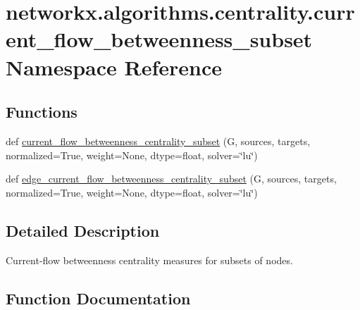 \hypertarget{namespacenetworkx_1_1algorithms_1_1centrality_1_1current__flow__betweenness__subset}{}\section{networkx.\+algorithms.\+centrality.\+current\+\_\+flow\+\_\+betweenness\+\_\+subset Namespace Reference}
\label{namespacenetworkx_1_1algorithms_1_1centrality_1_1current__flow__betweenness__subset}
\subsection*{Functions}
\begin{DoxyCompactItemize}
\item 
def \hyperlink{namespacenetworkx_1_1algorithms_1_1centrality_1_1current__flow__betweenness__subset_a071c108197a300666ffdf6534528e81e}{current\+\_\+flow\+\_\+betweenness\+\_\+centrality\+\_\+subset} (G, sources, targets, normalized=True, weight=None, dtype=float, solver=\char`\"{}lu\char`\"{})
\item 
def \hyperlink{namespacenetworkx_1_1algorithms_1_1centrality_1_1current__flow__betweenness__subset_acc620505010662686e69b1218b3065f3}{edge\+\_\+current\+\_\+flow\+\_\+betweenness\+\_\+centrality\+\_\+subset} (G, sources, targets, normalized=True, weight=None, dtype=float, solver=\char`\"{}lu\char`\"{})
\end{DoxyCompactItemize}


\subsection{Detailed Description}
\begin{DoxyVerb}Current-flow betweenness centrality measures for subsets of nodes.\end{DoxyVerb}
 

\subsection{Function Documentation}
\mbox{\label{namespacenetworkx_1_1algorithms_1_1centrality_1_1current__flow__betweenness__subset_a071c108197a300666ffdf6534528e81e}} 
